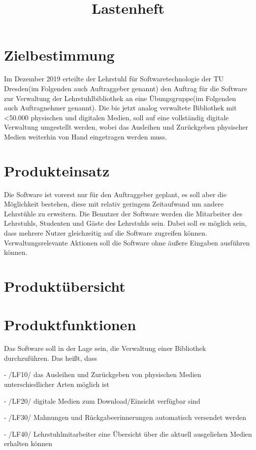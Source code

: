 \documentclass[12pt, a4paper]{article}
\title{Lastenheft}
\begin{document}
\maketitle
\pagebreak
\tableofcontents
\pagebreak

\section{Zielbestimmung}

Im Dezember 2019 erteilte der Lehrstuhl für Softwaretechnologie der TU Dresden(im Folgenden auch Auftraggeber genannt) den Auftrag für die Software zur Verwaltung der Lehrstuhlbibliothek an eine Übungsgruppe(im Folgenden auch Auftragnehmer genannt). Die bis jetzt analog verwaltete Bibliothek mit <50.000 physischen und digitalen Medien, soll auf eine vollständig digitale Verwaltung umgestellt werden, wobei das Ausleihen und Zurückgeben physischer Medien weiterhin von Hand eingetragen werden muss.

\section{Produkteinsatz}
Die Software ist vorerst nur für den Auftraggeber geplant, es soll aber die Möglichkeit bestehen, diese mit relativ geringem Zeitaufwand um andere Lehrstühle zu erweitern.
Die Benutzer der Software werden die Mitarbeiter des Lehrstuhls, Studenten und Gäste des Lehrstuhls sein. Dabei soll es möglich sein, dass mehrere Nutzer gleichzeitig auf die Software zugreifen können. Verwaltungsrelevante Aktionen soll die Software ohne äußere Eingaben ausführen können. 

\section{Produktübersicht}
\section{Produktfunktionen}
Das Software soll in der Lage sein, die Verwaltung einer Bibliothek durchzuführen. Das heißt, dass

- /LF10/ das Ausleihen und Zurückgeben von physischen Medien unterschiedlicher Arten möglich ist

- /LF20/ digitale Medien zum Download/Einsicht verfügbar sind

- /LF30/ Mahnungen und Rückgabeerinnerungen automatisch versendet werden

- /LF40/ Lehrstuhlmitarbeiter eine Übersicht über die aktuell ausgeliehen Medien erhalten können 
\end{document}
